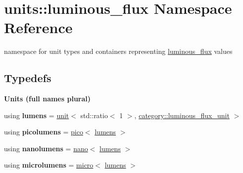 \hypertarget{namespaceunits_1_1luminous__flux}{}\section{units\+:\+:luminous\+\_\+flux Namespace Reference}
\label{namespaceunits_1_1luminous__flux}


namespace for unit types and containers representing \hyperlink{namespaceunits_1_1luminous__flux}{luminous\+\_\+flux} values  


\subsection*{Typedefs}
\begin{Indent}{\bf Units (full names plural)}\par
\begin{DoxyCompactItemize}
\item 
\hypertarget{namespaceunits_1_1luminous__flux_add67b989c4bfce87f27001781343839e}{}using {\bfseries lumens} = \hyperlink{structunits_1_1unit}{unit}$<$ std\+::ratio$<$ 1 $>$, \hyperlink{namespaceunits_1_1category_ad6cd329153c512e1aa33f56812660177}{category\+::luminous\+\_\+flux\+\_\+unit} $>$\label{namespaceunits_1_1luminous__flux_add67b989c4bfce87f27001781343839e}

\item 
\hypertarget{namespaceunits_1_1luminous__flux_a7221b11313e07f66df38bcc76e8e2868}{}using {\bfseries picolumens} = \hyperlink{group___unit_manipulators_ga82a8d14a3e0877a375a66b64c45baab9}{pico}$<$ \hyperlink{structunits_1_1unit}{lumens} $>$\label{namespaceunits_1_1luminous__flux_a7221b11313e07f66df38bcc76e8e2868}

\item 
\hypertarget{namespaceunits_1_1luminous__flux_a36ceadd0cf365c4888cc233222c411de}{}using {\bfseries nanolumens} = \hyperlink{group___unit_manipulators_ga1c25c3c1d6c1f3aed3fd1ecf043110d5}{nano}$<$ \hyperlink{structunits_1_1unit}{lumens} $>$\label{namespaceunits_1_1luminous__flux_a36ceadd0cf365c4888cc233222c411de}

\item 
\hypertarget{namespaceunits_1_1luminous__flux_a8f258038adf93eb6d963c28bb895e99f}{}using {\bfseries microlumens} = \hyperlink{group___unit_manipulators_gaea53c906ec805110b93f02db4a961971}{micro}$<$ \hyperlink{structunits_1_1unit}{lumens} $>$\label{namespaceunits_1_1luminous__flux_a8f258038adf93eb6d963c28bb895e99f}


\end{DoxyCompactItemize}
\end{Indent}
